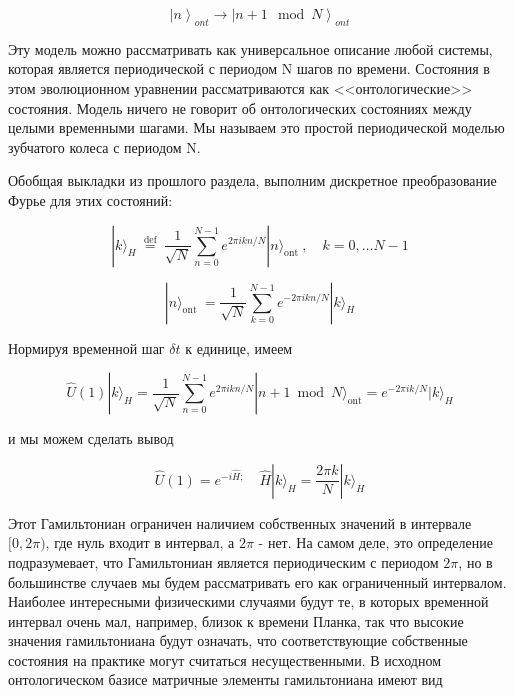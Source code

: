 \documentclass[main.tex]{subfiles}
\begin{document}
\begin{equation}\label{2.20}
	\left|n\right>_{ont} \rightarrow \left|n + 1 \mod N\right>_{ont}
\end{equation}
             
Эту модель можно рассматривать как универсальное описание любой системы, которая является периодической с периодом N шагов по времени. Состояния в этом эволюционном уравнении рассматриваются как <<онтологические>> состояния. Модель ничего не говорит об онтологических состояниях между целыми временными шагами. Мы называем это простой периодической моделью зубчатого колеса с периодом N.

Обобщая выкладки из прошлого раздела, выполним дискретное преобразование Фурье для этих состояний:

\begin{equation}\label{2.21}
	|k\rangle_{H} \stackrel{\text { def }}{=} \frac{1}{\sqrt{N}} \sum_{n=0}^{N-1} e^{2 \pi i k n / N}|n\rangle_{\text {ont }}, \quad k=0, \ldots N-1
\end{equation}

\begin{equation}\label{2.22}
	|n\rangle_{\text {ont }}=\frac{1}{\sqrt{N}} \sum_{k=0}^{N-1} e^{-2 \pi i k n / N}|k\rangle_{H}
\end{equation}

Нормируя временной шаг $\delta t$ к единице, имеем


\begin{equation}\label{2.23}
	\hat U(1)|k\rangle_{H}=\frac{1}{\sqrt{N}} \sum_{n=0}^{N-1} e^{2 \pi i k n / N}|n+1 \bmod N\rangle_{\mathrm{ont}}=e^{-2 \pi i k / N}|k\rangle_{H}
\end{equation}

и мы можем сделать вывод

\begin{equation}\label{2.24}
	\hat U(1)=e^{-i \hat H ;} \quad \hat H|k\rangle_{H}=\frac{2 \pi k}{N}|k\rangle_{H}
\end{equation}
                         
Этот Гамильтониан ограничен наличием собственных значений в интервале $[0, 2\pi)$, где нуль входит в интервал, а $2\pi$ - нет. На самом деле, это определение подразумевает, что Гамильтониан является периодическим с периодом $2\pi$, но в большинстве случаев мы будем рассматривать его как ограниченный интервалом. Наиболее интересными физическими случаями будут те, в которых временной интервал очень мал, например, близок к времени Планка, так что высокие значения гамильтониана будут означать, что соответствующие собственные состояния на практике могут считаться несущественными.
В исходном онтологическом базисе матричные элементы гамильтониана имеют вид
\end{document}

